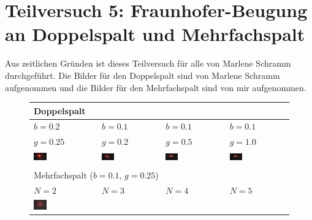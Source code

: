 \section{Teilversuch 5: Fraunhofer-Beugung an Doppelspalt und Mehrfachspalt}
	Aus zeitlichen Gründen ist dieses Teilversuch für alle von Marlene Schramm durchgeführt. Die Bilder für den Doppelspalt sind von Marlene Schramm aufgenommen und die Bilder für den Mehrfachspalt sind von mir aufgenommen. 
	
	\begin{figure}[H]
		\centering
			\begin{tabular}{llll}
				\multicolumn{4}{l}{Doppelspalt} \\
				\toprule
					$b = \num{0.2}$  & $b = \num{0.1}$ & $b = \num{0.1}$ & $b = \num{0.1}$ \\
					$g = \num{0.25}$ & $g = \num{0.2}$ & $g = \num{0.5}$ & $g = \num{1.0}$ \\
				\midrule
					\includegraphics[width=0.22\textwidth]{images/tv5/doppelspalt/b_0.2_g_0.25.jpg} &
					\includegraphics[width=0.22\textwidth]{images/tv5/doppelspalt/b_0.1_g_0.2.jpg} &
					\includegraphics[width=0.22\textwidth]{images/tv5/doppelspalt/b_0.1_g_0.5.jpg} &
					\includegraphics[width=0.22\textwidth]{images/tv5/doppelspalt/b_0.1_g_1.0.jpg} \\
				\bottomrule
				\\
				\multicolumn{4}{l}{Mehrfachspalt ($b = \num{0.1}$, $g = \num{0.25}$)} \\
				\toprule
					$N = 2$ & $N = 3$ & $N = 4$ & $N = 5$ \\
				\midrule
					\includegraphics[width=0.22\textwidth]{images/tv5/mehrfachspalt/n_2.jpg} &

\end{tabular}
\end{figure}
